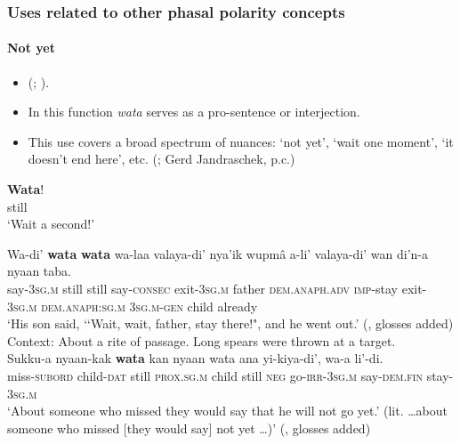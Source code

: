 \subsubsection{Uses related to other phasal polarity concepts}
\paragraph{Not yet} \label{appendixIatmulNotYet}
\begin{itemize}
	\item \citeauthor{Jandraschek2007} (\citeyear[24]{Jandraschek2007}; \citeyear[218, 550]{Jandraschek2012}).
	\item In this function \textit{wata} serves as a pro-sentence or interjection.
	\item This use covers a broad spectrum of nuances: \lq not yet', \lq wait one moment', \lq it doesn't end here', etc. (\cite[550]{Jandraschek2012}; Gerd Jandraschek, p.c.)
\end{itemize}

\begin{exe}
	\ex
	\gll \textbf{Wata}!\\
	still\\
	\glt \lq Wait a second!' \parencite[218]{Jandraschek2012}

	\ex
	\gll
	Wa-di’ \textbf{wata} \textbf{wata} wa-laa valaya-di’ nya’ik wupmâ a-li’ valaya-di’ wan di’n-a	nyaan taba.\\
say-3\textsc{sg.m} still still	 say-\textsc{consec} exit-3\textsc{sg.m} father \textsc{dem.anaph.adv} \textsc{imp}-stay exit-3\textsc{sg.m} \textsc{dem}.\textsc{anaph}:\textsc{sg}.\textsc{m} 3\textsc{sg.m}-\textsc{gen} child already\\
\glt \lq His son said, \lq\lq Wait, wait, father, stay there!", and he went out.' (\cite[54]{Jandraschek2008}, glosses added)
	\pagebreak
	\ex Context: About a rite of passage. Long spears were thrown at a target.\\
	\gll Sukku-a  nyaan-kak \textbf{wata} kan nyaan wata ana yi-kiya-di’, wa-a li’-di.\\
	miss-\textsc{subord}	child-\textsc{dat} still \textsc{prox.sg.m} child still \textsc{neg} go-\textsc{irr}-3\textsc{sg.m} say-\textsc{dem.fin} stay-3\textsc{sg.m}\\
	\glt \lq About someone who missed they would say that he will not go yet.' (lit. …about someone who missed  [they would say] not yet …)' (\cite[31]{Jandraschek2008}, glosses added)
\end{exe}

